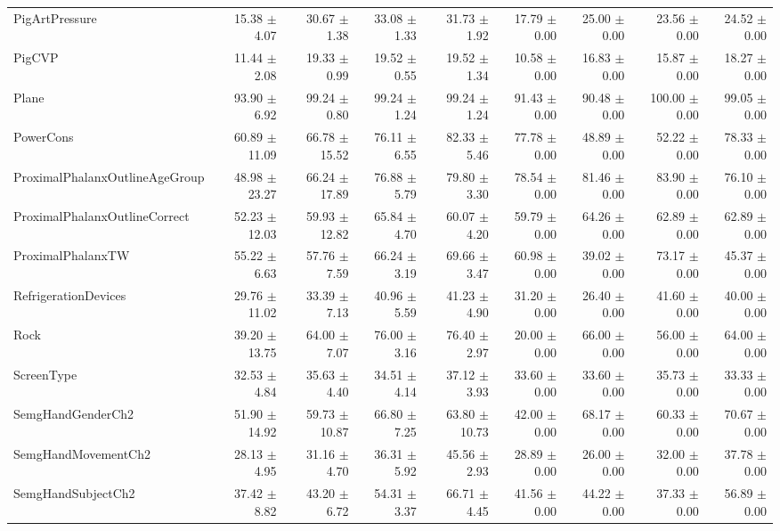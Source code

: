 \begin{landscape}
\begin{longtable}{lrrrrrrrr}
PigArtPressure & 15.38 $\pm$ 4.07 & 30.67 $\pm$ 1.38 & 33.08 $\pm$ 1.33 & 31.73 $\pm$ 1.92 & 17.79 $\pm$ 0.00 & 25.00 $\pm$ 0.00 & 23.56 $\pm$ 0.00 & 24.52 $\pm$ 0.00 \\
PigCVP & 11.44 $\pm$ 2.08 & 19.33 $\pm$ 0.99 & 19.52 $\pm$ 0.55 & 19.52 $\pm$ 1.34 & 10.58 $\pm$ 0.00 & 16.83 $\pm$ 0.00 & 15.87 $\pm$ 0.00 & 18.27 $\pm$ 0.00 \\
Plane & 93.90 $\pm$ 6.92 & 99.24 $\pm$ 0.80 & 99.24 $\pm$ 1.24 & 99.24 $\pm$ 1.24 & 91.43 $\pm$ 0.00 & 90.48 $\pm$ 0.00 & 100.00 $\pm$ 0.00 & 99.05 $\pm$ 0.00 \\
PowerCons & 60.89 $\pm$ 11.09 & 66.78 $\pm$ 15.52 & 76.11 $\pm$ 6.55 & 82.33 $\pm$ 5.46 & 77.78 $\pm$ 0.00 & 48.89 $\pm$ 0.00 & 52.22 $\pm$ 0.00 & 78.33 $\pm$ 0.00 \\
ProximalPhalanxOutlineAgeGroup & 48.98 $\pm$ 23.27 & 66.24 $\pm$ 17.89 & 76.88 $\pm$ 5.79 & 79.80 $\pm$ 3.30 & 78.54 $\pm$ 0.00 & 81.46 $\pm$ 0.00 & 83.90 $\pm$ 0.00 & 76.10 $\pm$ 0.00 \\
ProximalPhalanxOutlineCorrect & 52.23 $\pm$ 12.03 & 59.93 $\pm$ 12.82 & 65.84 $\pm$ 4.70 & 60.07 $\pm$ 4.20 & 59.79 $\pm$ 0.00 & 64.26 $\pm$ 0.00 & 62.89 $\pm$ 0.00 & 62.89 $\pm$ 0.00 \\
ProximalPhalanxTW & 55.22 $\pm$ 6.63 & 57.76 $\pm$ 7.59 & 66.24 $\pm$ 3.19 & 69.66 $\pm$ 3.47 & 60.98 $\pm$ 0.00 & 39.02 $\pm$ 0.00 & 73.17 $\pm$ 0.00 & 45.37 $\pm$ 0.00 \\
RefrigerationDevices & 29.76 $\pm$ 11.02 & 33.39 $\pm$ 7.13 & 40.96 $\pm$ 5.59 & 41.23 $\pm$ 4.90 & 31.20 $\pm$ 0.00 & 26.40 $\pm$ 0.00 & 41.60 $\pm$ 0.00 & 40.00 $\pm$ 0.00 \\
Rock & 39.20 $\pm$ 13.75 & 64.00 $\pm$ 7.07 & 76.00 $\pm$ 3.16 & 76.40 $\pm$ 2.97 & 20.00 $\pm$ 0.00 & 66.00 $\pm$ 0.00 & 56.00 $\pm$ 0.00 & 64.00 $\pm$ 0.00 \\
ScreenType & 32.53 $\pm$ 4.84 & 35.63 $\pm$ 4.40 & 34.51 $\pm$ 4.14 & 37.12 $\pm$ 3.93 & 33.60 $\pm$ 0.00 & 33.60 $\pm$ 0.00 & 35.73 $\pm$ 0.00 & 33.33 $\pm$ 0.00 \\
SemgHandGenderCh2 & 51.90 $\pm$ 14.92 & 59.73 $\pm$ 10.87 & 66.80 $\pm$ 7.25 & 63.80 $\pm$ 10.73 & 42.00 $\pm$ 0.00 & 68.17 $\pm$ 0.00 & 60.33 $\pm$ 0.00 & 70.67 $\pm$ 0.00 \\
SemgHandMovementCh2 & 28.13 $\pm$ 4.95 & 31.16 $\pm$ 4.70 & 36.31 $\pm$ 5.92 & 45.56 $\pm$ 2.93 & 28.89 $\pm$ 0.00 & 26.00 $\pm$ 0.00 & 32.00 $\pm$ 0.00 & 37.78 $\pm$ 0.00 \\
SemgHandSubjectCh2 & 37.42 $\pm$ 8.82 & 43.20 $\pm$ 6.72 & 54.31 $\pm$ 3.37 & 66.71 $\pm$ 4.45 & 41.56 $\pm$ 0.00 & 44.22 $\pm$ 0.00 & 37.33 $\pm$ 0.00 & 56.89 $\pm$ 0.00 \\

\end{longtable}
\end{landscape}
